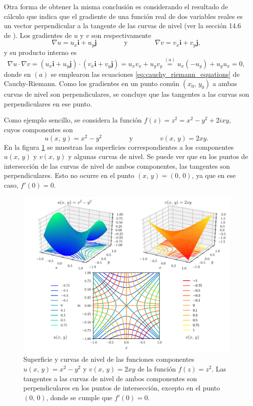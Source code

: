 \documentclass[a4paper]{report}
\begin{document}
Otra forma de obtener la misma conclusión es considerando el resultado de cálculo que indica que el gradiente de una función real de dos variables reales es un vector perpendicular a la tangente de las curvas de nivel (ver la sección 14.6 de \cite{stewart2016multivariable}). Los gradientes de \(u\) y \(v\) son respectivamente
\[
 \nabla u=u_x\mathbf{i}+u_y\mathbf{j}
 \qquad\qquad\textrm{y}\qquad\qquad
 \nabla v=v_x\mathbf{i}+v_y\mathbf{j},
\]
y su producto interno es
\[
 \nabla u\cdot\nabla v=(u_x\mathbf{i}+u_y\mathbf{j})\cdot(v_x\mathbf{i}+v_y\mathbf{j})
 =u_xv_x+u_yv_y\overset{(a)}{=}u_x(-u_y)+u_yu_x=0,
\]
donde en \((a)\) se emplearon las ecuaciones \ref{eq:cauchy_riemann_equations} de Cauchy-Riemann. Como los gradientes en un punto común \((x_0,\,y_0)\) a ambas curvas de nivel son perpendiculares, se concluye que las tangentes a las curvas son perpendiculares en ese punto.

Como ejemplo sencillo, se considera la función \(f(z)=z^2=x^2-y^2+2ixy\), cuyos componentes son
\[
 u(x,\,y)=x^2-y^2
 \qquad\qquad\textrm{y}\qquad\qquad
 v(x,\,y)=2xy.
\]
En la figura \ref{fig:exercise_27_2_example} se muestran las superficies correspondientes a los componentes \(u(x,\,y)\) y \(v(x,\,y)\) y algunas curvas de nivel. Se puede ver que en los puntos de intersección de las curvas de nivel de ambos componentes, las tangentes son perpendiculares. Esto no ocurre en el punto \((x,\,y)=(0,\,0)\), ya que en ese caso, \(f'(0)=0\).
\begin{figure}[!htb]
 \begin{center}
 \includegraphics[width=\textwidth]{figuras/exercise_27_2_example.pdf}
 \caption{\label{fig:exercise_27_2_example} Superficie y curvas de nivel de las funciones componentes \(u(x,\,y)=x^2-y^2\) y \(v(x,\,y)=2xy\) de la función \(f(z)=z^2\). Las tangentes a las curvas de nivel de ambos componentes son perpendiculares en los puntos de intersección, excepto en el punto \((0,\,0)\), donde se cumple que \(f'(0)=0\).}
 \end{center}
\end{figure}
\end{document}
